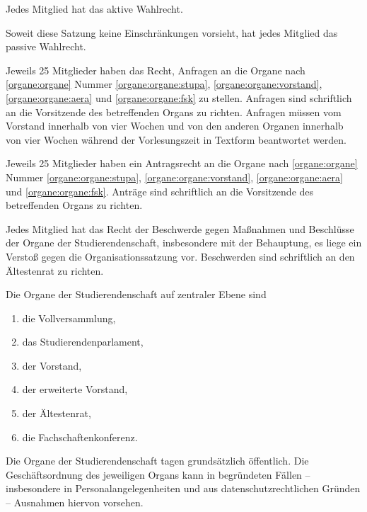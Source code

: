 \begin{jurdoc}
Jedes Mitglied hat das aktive Wahlrecht.

Soweit diese Satzung keine Einschränkungen vorsieht, hat jedes Mitglied das passive Wahlrecht.

Jeweils 25 Mitglieder haben das Recht, Anfragen an die Organe nach \ref{organe:organe} Nummer \ref{organe:organe:stupa}, \ref{organe:organe:vorstand}, \ref{organe:organe:aera} und \ref{organe:organe:fsk} zu stellen. Anfragen sind schriftlich an die Vorsitzende des betreffenden Organs zu richten.
Anfragen müssen vom Vorstand innerhalb von vier Wochen und von den anderen Organen innerhalb von vier Wochen während der Vorlesungszeit in Textform beantwortet werden.\label{studierendenschaft:mitglieder:anfragen}

Jeweils 25 Mitglieder haben ein Antragsrecht an die Organe nach \ref{organe:organe} Nummer \ref{organe:organe:stupa}, \ref{organe:organe:vorstand}, \ref{organe:organe:aera} und \ref{organe:organe:fsk}. Anträge sind schriftlich an die Vorsitzende des betreffenden Organs zu richten.\label{studierendenschaft:mitglieder:antraege}

Jedes Mitglied hat das Recht der Beschwerde gegen Maßnahmen und Beschlüsse der Organe der Studierendenschaft, insbesondere mit der Behauptung, es liege ein Verstoß gegen die Organisationssatzung vor. Beschwerden sind schriftlich an den Ältestenrat zu richten. \label{studierendenschaft:mitglieder:beschwerden}


Die Organe der Studierendenschaft auf zentraler Ebene sind \label{organe:organe}
\begin{enumerate}
\item die Vollversammlung,
\item das Studierendenparlament, \label{organe:organe:stupa}
\item der Vorstand, \label{organe:organe:vorstand}
\item der erweiterte Vorstand,
\item der Ältestenrat, \label{organe:organe:aera}
\item die Fachschaftenkonferenz. \label{organe:organe:fsk}
\end{enumerate}

Die Organe der Studierendenschaft tagen grundsätzlich öffentlich. Die Geschäftsordnung des jeweiligen Organs kann in begründeten Fällen -- insbesondere in Personalangelegenheiten und aus datenschutzrechtlichen Gründen -- Ausnahmen hiervon vorsehen.


\end{jurdoc}
